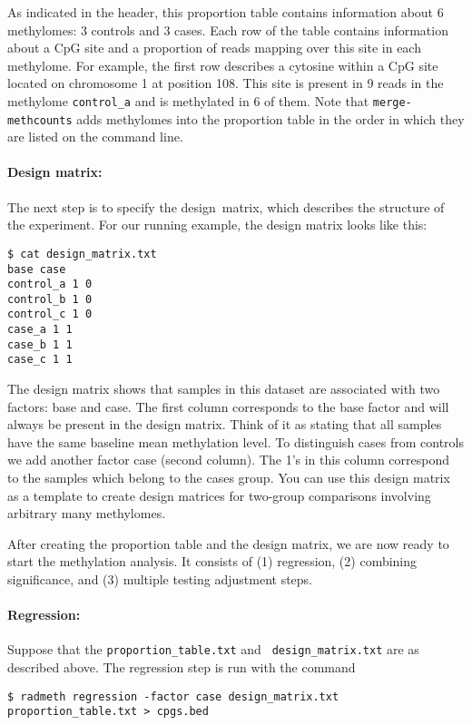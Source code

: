 \documentclass[10pt]{article}
\newcommand{\prog}[1]{\texttt{#1}}
\begin{document}
As indicated in the header, this proportion table contains information about 6
methylomes: 3 controls and 3 cases. Each row of the table contains information
about a CpG site and a proportion of reads mapping over this site in each
methylome. For example, the first row describes a cytosine within a CpG site
located on chromosome 1 at position 108. This site is present in 9 reads in the
methylome {\tt control\_a} and is methylated in 6 of them. Note that 
\prog{merge-methcounts} adds methylomes into the proportion table in the order 
in which they are listed on the command line.

\paragraph{Design matrix:} The next step is to specify the design\ matrix, which
describes the structure of the experiment. For our running example, the design
matrix looks like this:

{\small{%
\begin{verbatim}
$ cat design_matrix.txt
base case
control_a 1 0
control_b 1 0
control_c 1 0
case_a 1 1
case_b 1 1
case_c 1 1
\end{verbatim}%
}}

The design matrix shows that samples in this dataset are associated with two 
factors: base and case. The first column corresponds to the base factor and 
will always be present in the design matrix. Think of it as stating that all 
samples have the same baseline mean methylation level. To distinguish 
cases from controls we add another factor case (second column). The 1's in 
this column correspond to the samples which belong to the cases group. You 
can use this design matrix as a template to create design matrices for 
two-group comparisons involving arbitrary many methylomes.

After creating the proportion table and the design matrix, we are now ready
to start the methylation analysis. It consists of (1) regression, (2)
combining significance, and (3) multiple testing adjustment steps.

\paragraph{Regression:} Suppose that the {\tt proportion\_table.txt} and {\tt 
design\_matrix.txt} are as described above. The regression step is run with 
the command

{\small{%
\begin{verbatim}
$ radmeth regression -factor case design_matrix.txt proportion_table.txt > cpgs.bed
\end{verbatim}%
}}
\end{document}

